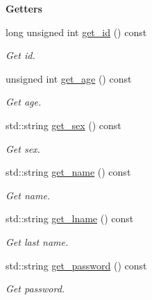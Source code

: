 \begin{Indent}{\bf Getters}\par
\begin{DoxyCompactItemize}
\item 
long unsigned int \hyperlink{class_cuser_a06efeb2dbb2bbccab0e8997eebd2da47}{get\+\_\+id} () const 
\begin{DoxyCompactList}\small\item\em Get id. \end{DoxyCompactList}\item 
unsigned int \hyperlink{class_cuser_a8611793c31edced138685b0d1989dc3c}{get\+\_\+age} () const 
\begin{DoxyCompactList}\small\item\em Get age. \end{DoxyCompactList}\item 
std\+::string \hyperlink{class_cuser_a5847a7846126a599ff20d32fd82f0105}{get\+\_\+sex} () const 
\begin{DoxyCompactList}\small\item\em Get sex. \end{DoxyCompactList}\item 
std\+::string \hyperlink{class_cuser_a34ee78b8655c4439528e1d63a5974683}{get\+\_\+name} () const 
\begin{DoxyCompactList}\small\item\em Get name. \end{DoxyCompactList}\item 
std\+::string \hyperlink{class_cuser_afa69506b9d0b6aa61a669c20e7e4862d}{get\+\_\+lname} () const 
\begin{DoxyCompactList}\small\item\em Get last name. \end{DoxyCompactList}\item 
std\+::string \hyperlink{class_cuser_ac5b9b699501987e6fc957366a81a1248}{get\+\_\+password} () const 
\begin{DoxyCompactList}\small\item\em Get password. \end{DoxyCompactList}\end{DoxyCompactItemize}
\end{Indent}

